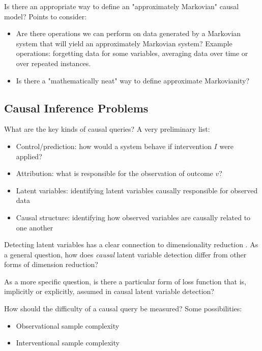 \begin{question}
    Is there an appropriate way to define an "approximately Markovian" causal model?
    Points to consider:
    \begin{itemize}
        \item Are there operations we can perform on data generated by a Markovian system that will yield an approximately Markovian system? Example operations: forgetting data for some variables, averaging data over time or over repeated instances.
        \item Is there a "mathematically neat" way to define approximate Markovianity?
    \end{itemize}
\end{question}

\subsection{Causal Inference Problems}

\begin{question}\label{q:causal_queries}
    What are the key kinds of causal queries? A very preliminary list:
    \begin{itemize}
        \item Control/prediction: how would a system behave if intervention $I$ were applied?
        \item Attribution: what is responsible for the observation of outcome $v$?
        \item Latent variables: identifying latent variables causally responsible for observed data
        \item Causal structure: identifying how observed variables are causally related to one another
    \end{itemize}
\end{question}

\begin{question}
    Detecting latent variables has a clear connection to dimensionality reduction \cite{kummerfeld_causal_2016}. As a general question, how does \emph{causal} latent variable detection differ from other forms of dimension reduction?
    
    As a more specific question, is there a particular form of loss function that is, implicitly or explicitly, assumed in causal latent variable detection? 
\end{question}

\begin{question}\label{q:causal_query_difficulty}
    How should the difficulty of a causal query be measured?
    Some possibilities:
    \begin{itemize}
        \item Observational sample complexity
        \item Interventional sample complexity
    \end{itemize}
\end{question}

